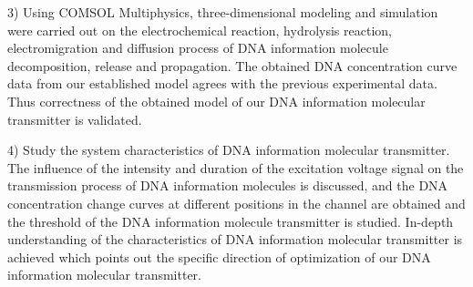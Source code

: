 \begin{abstract*}
3) Using COMSOL Multiphysics, three-dimensional modeling and simulation were carried out on the electrochemical reaction, hydrolysis reaction, electromigration and diffusion process of DNA information molecule decomposition, release and propagation. The obtained DNA concentration curve data from our established model agrees with the previous experimental data. Thus correctness of the obtained model of our DNA information molecular transmitter is validated.

4) Study the system characteristics of DNA information molecular transmitter. The influence of the intensity and duration of the excitation voltage signal on the transmission process of DNA information molecules is discussed, and the DNA concentration change curves at different positions in the channel are obtained and the threshold of the DNA information molecule transmitter is studied. In-depth understanding of the characteristics of DNA information molecular transmitter is achieved which points out the specific direction of optimization of our DNA information molecular transmitter.

\end{abstract*}
